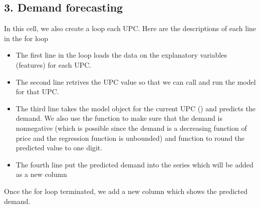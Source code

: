 \documentclass[letterpaper,10pt,english]{jupyterBook}
\begin{document}
\subsection{3. Demand forecasting}
\label{\detokenize{docs/Case1_3_Module1B_Retail_Demand_Predict:demand-forecasting}}
\sphinxAtStartPar
In this cell, we also create a loop  each UPC. Here are the descriptions of each line in the for loop
\begin{itemize}
\item {} 
\sphinxAtStartPar
The first line in the  loop loads the data on the explanatory variables (features) for each UPC.

\item {} 
\sphinxAtStartPar
The second line retrives the UPC value so that we can call and run the model for that UPC.

\item {} 
\sphinxAtStartPar
The third line takes the model object for the current UPC () and predicts the demand. We also use the function  to make sure that the demand is non\sphinxhyphen{}negative (which is possible since the demand is a decreasing function of price and the regression function is unbounded) and function  to round the predicted value to one digit.

\item {} 
\sphinxAtStartPar
The fourth line put the predicted demand into the series which will be added as a new column

\end{itemize}

\sphinxAtStartPar
Once the for loop terminated, we add a new column  which shows the predicted demand.
\end{document}
